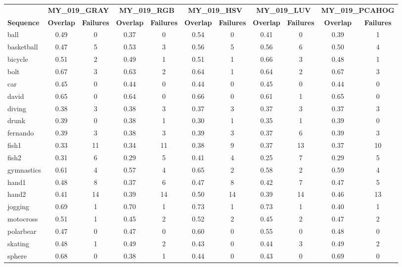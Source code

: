 \begin{table}
\begin{center}
\begin{tabular}{l c c c c c c c c c c}
\hline 
  & \multicolumn{2}{c}{{\bf MY_019_GRAY}}& \multicolumn{2}{c}{{\bf MY_019_RGB}}& \multicolumn{2}{c}{{\bf MY_019_HSV}}& \multicolumn{2}{c}{{\bf MY_019_LUV}}& \multicolumn{2}{c}{{\bf MY_019_PCAHOG}}\\
{\bf Sequence} & {\bf Overlap} & {\bf Failures} & {\bf Overlap} & {\bf Failures} & {\bf Overlap} & {\bf Failures} & {\bf Overlap} & {\bf Failures} & {\bf Overlap} & {\bf Failures} \\
\hline 
ball & 0.49 & 0 & 0.37 & 0 & 0.54 & 0 & 0.41 & 0 & 0.39 & 1\\
basketball & 0.47 & 5 & 0.53 & 3 & 0.56 & 5 & 0.56 & 6 & 0.50 & 4\\
bicycle & 0.51 & 2 & 0.49 & 1 & 0.51 & 1 & 0.66 & 3 & 0.48 & 1\\
bolt & 0.67 & 3 & 0.63 & 2 & 0.64 & 1 & 0.64 & 2 & 0.67 & 3\\
car & 0.45 & 0 & 0.44 & 0 & 0.44 & 0 & 0.45 & 0 & 0.44 & 0\\
david & 0.65 & 0 & 0.64 & 0 & 0.66 & 0 & 0.61 & 1 & 0.65 & 0\\
diving & 0.38 & 3 & 0.38 & 3 & 0.37 & 3 & 0.37 & 3 & 0.37 & 3\\
drunk & 0.39 & 0 & 0.38 & 1 & 0.30 & 1 & 0.35 & 1 & 0.39 & 0\\
fernando & 0.39 & 3 & 0.38 & 3 & 0.39 & 3 & 0.37 & 6 & 0.39 & 3\\
fish1 & 0.33 & 11 & 0.34 & 11 & 0.38 & 9 & 0.37 & 13 & 0.37 & 10\\
fish2 & 0.31 & 6 & 0.29 & 5 & 0.41 & 4 & 0.25 & 7 & 0.29 & 5\\
gymnastics & 0.61 & 4 & 0.57 & 4 & 0.65 & 2 & 0.58 & 2 & 0.59 & 4\\
hand1 & 0.48 & 8 & 0.37 & 6 & 0.47 & 8 & 0.42 & 7 & 0.47 & 5\\
hand2 & 0.41 & 14 & 0.39 & 14 & 0.50 & 14 & 0.39 & 14 & 0.46 & 13\\
jogging & 0.69 & 1 & 0.70 & 1 & 0.73 & 1 & 0.73 & 1 & 0.40 & 1\\
motocross & 0.51 & 1 & 0.45 & 2 & 0.52 & 2 & 0.45 & 2 & 0.47 & 2\\
polarbear & 0.47 & 0 & 0.47 & 0 & 0.60 & 0 & 0.55 & 0 & 0.48 & 0\\
skating & 0.48 & 1 & 0.49 & 2 & 0.43 & 0 & 0.44 & 3 & 0.49 & 2\\
sphere & 0.68 & 0 & 0.38 & 1 & 0.44 & 0 & 0.43 & 0 & 0.69 & 0\\

\end{tabular}
\end{center}
\end{table}
